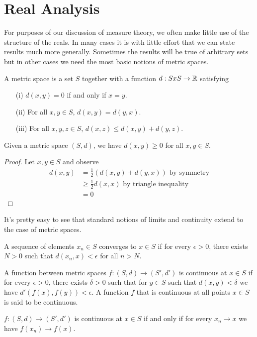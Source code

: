 \chapter{Real Analysis}
For purposes of our discussion of measure theory, we often make little
use of the structure of the reals.  In many cases it is with little
effort that we can state results much more generally.  Sometimes the
results will be true of arbitrary sets but in other cases we need the
most basic notions of metric spaces.
\begin{defn}A metric space is a set $S$ together with a function
  $d:SxS \to \mathbb{R}$ satisfying
\begin{itemize}
\item[(i)]$d(x,y) = 0$ if and only if $x=y$.
\item[(ii)]For all $x,y \in S$, $d(x,y) = d(y,x)$.
\item[(iii)]For all $x,y,z \in S$, $d(x,z) \leq d(x,y) + d(y,z)$.
\end{itemize}
\end{defn}
\begin{lem}\label{MetricSpaceIsPseudometric}Given a metric space $(S,d)$, we have $d(x,y) \geq 0$ for all
  $x,y \in S$.
\end{lem}
\begin{proof}
Let $x,y \in S$ and observe 
\begin{align*}
d(x,y) &= \frac{1}{2} (d(x,y) + d(y,x)) \textrm { by symmetry} \\
&\geq \frac{1}{2} d(x,x) \textrm{ by triangle inequality} \\
&= 0
\end{align*}
\end{proof}
 It's pretty easy to see that standard notions of limits and continuity
extend to the case of metric spaces.
\begin{defn}A sequence of elements $x_n \in S$ converges to $x \in S$
  if for every $\epsilon > 0$, there exists $N > 0$ such that
  $d(x_n,x) < \epsilon$ for all $n > N$.
\end{defn}
\begin{defn}A function between metric spaces $f : (S,d) \to (S', d')$
  is continuous at $x \in S$ if for every $\epsilon>0$, there exists
  $\delta > 0$ such that for $y\in S$ such that $d(x,y)<\delta$ we
  have $d'(f(x),f(y)) < \epsilon$.  A function $f$ that is continuous
  at all points $x \in S$ is said to be continuous.
\end{defn}
\begin{lem}$f : (S,d) \to (S', d')$ is continuous at $x \in S$ if and only if for
  every $x_n \to x$ we have $f(x_n) \to f(x)$.
\end{lem}
